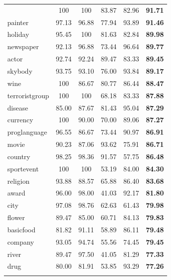 {\begin{table}[h]
\begin{center}
\begin{tabular}{|l||c|c|c|c||c|}
{    university        &    100  &    100  &  83.87  &  82.96  &  \textbf{91.71} \\
    painter           &  97.13  &  96.88  &  77.94  &  93.89  &  \textbf{91.46} \\
    holiday           &  95.45  &    100  &  81.63  &  82.84  &  \textbf{89.98} \\
    newspaper         &  92.13  &  96.88  &  73.44  &  96.64  &  \textbf{89.77} \\
    actor             &  92.74  &  92.24  &  89.47  &  83.33  &  \textbf{89.45} \\
    skybody           &  93.75  &  93.10  &  76.00  &  93.84  &  \textbf{89.17} \\
    wine              &    100  &  86.67  &  80.77  &  86.44  &  \textbf{88.47} \\
    terroristgroup    &    100  &    100  &  68.18  &  83.33  &  \textbf{87.88} \\
    disease           &  85.00  &  87.67  &  81.43  &  95.04  &  \textbf{87.29} \\
    currency          &    100  &  90.00  &  70.00  &  89.06  &  \textbf{87.27} \\
    proglanguage      &  96.55  &  86.67  &  73.44  &  90.97  &  \textbf{86.91} \\
    movie             &  90.23  &  87.06  &  93.62  &  75.91  &  \textbf{86.71} \\
    country           &  98.25  &  98.36  &  91.57  &  57.75  &  \textbf{86.48} \\
    sportevent        &    100  &    100  &  53.19  &  84.00  &  \textbf{84.30} \\
    religion          &  93.88  &  88.57  &  65.88  &  86.40  &  \textbf{83.68} \\
    award             &  96.00  &  98.00  &  41.03  &  92.17  &  \textbf{81.80} \\
    city              &  97.08  &  98.76  &  62.63  &  61.43  &  \textbf{79.98} \\
    flower            &  89.47  &  85.00  &  60.71  &  84.13  &  \textbf{79.83} \\
    basicfood         &  81.82  &  91.11  &  58.89  &  86.11  &  \textbf{79.48} \\
    company           &  93.05  &  94.74  &  55.56  &  74.45  &  \textbf{79.45} \\
    river             &  89.47  &  97.50  &  41.05  &  81.29  &  \textbf{77.33} \\
    drug              &  80.00  &  81.91  &  53.85  &  93.29  &  \textbf{77.26} \\
}
\end{tabular}
\end{center}
\end{table}}
